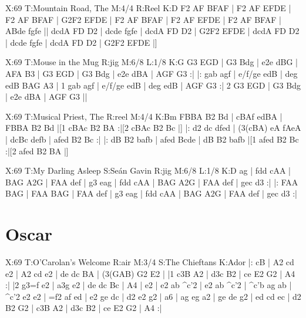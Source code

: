 \documentclass{article}
\begin{document}
\begin{abc}[name]
X:69
T:Mountain Road, The
M:4/4
R:Reel
K:D
F2 AF BFAF | F2 AF EFDE | F2 AF BFAF | G2F2 EFDE |
F2 AF BFAF | F2 AF EFDE | F2 AF BFAF | ABde fgfe ||
dcdA FD D2 | dcde fgfe | dcdA FD D2 | G2F2 EFDE |
dcdA FD D2 | dcde fgfe | dcdA FD D2 | G2F2 EFDE |]
\end{abc}

\begin{abc}[name]
X:69
T:Mouse in the Mug
R:jig
M:6/8
L:1/8
K:G
G3 EGD | G3 Bdg | e2e dBG | AFA B3 |
G3 EGD | G3 Bdg | e2e dBA | AGF G3 :|
|: gab agf | e/f/ge edB | deg edB BAG A3 |
1 gab agf | e/f/ge edB | deg edB | AGF G3 :|
2 G3 EGD | G3 Bdg | e2e dBA | AGF G3 ||
\end{abc}

\begin{abc}[name]
X:69
T:Musical Priest, The
R:reel
M:4/4
K:Bm
FBBA B2 Bd | cBAf edBA | FBBA B2 Bd |[1 cBAc B2 BA :|[2 cBAc B2 Bc |]
|: d2 dc dfed | (3(cBA) eA fAeA | dcBc defb | afed B2 Bc :|
|: dB B2 bafb | afed Bcde | dB B2 bafb |[1 afed B2 Bc :|[2 afed B2 BA |]
\end{abc}

\begin{abc}[name]
X:69
T:My Darling Asleep
S:Seán Gavin
R:jig
M:6/8
L:1/8
K:D
ag | fdd cAA | BAG A2G | FAA def | g3 eag |
fdd cAA | BAG A2G | FAA def | gec d3 :|
|: FAA BAG | FAA BAG | FAA def | g3 eag |
fdd cAA | BAG A2G | FAA def | gec d3 :|
\end{abc}

\section{Oscar}

\begin{abc}[name]
X:69
T:O'Carolan's Welcome
R:air
M:3/4
S:The Chieftans
K:Ador
|: cB | A2 cd e2 | A2 cd e2 | de dc BA | (3(GAB) G2 E2 |
|1 c3B A2 | d3c B2 | ce E2 G2 | A4 :|
|2 g3=f e2 | a3g e2 | de dc Bc | A4 |
e2 | e2 ab ^c'2 | e2 ab ^c'2 | ^c'b ag ab | ^c'2 e2 e2 |
=f2 af ed | e2 ge dc | d2 e2 g2 | a6 |
ag eg a2 | ge de g2 | ed cd ec | d2 B2 G2 |
c3B A2 | d3c B2 | ce E2 G2 | A4 :|
\end{abc}
\end{document}
